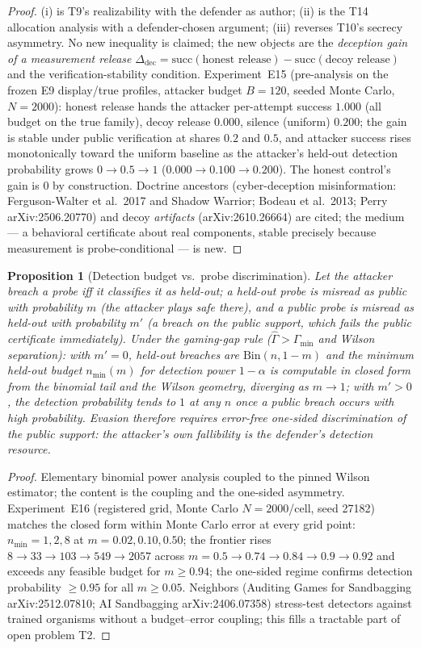 \documentclass[11pt]{article}
\newtheorem{proposition}{Proposition}
\begin{document}
\begin{proof}
(i) is T9's realizability with the defender as author; (ii) is the T14
allocation analysis with a defender-chosen argument; (iii) reverses T10's
secrecy asymmetry. No new inequality is claimed; the new objects are the
\emph{deception gain of a measurement release}
$\Delta_{\mathrm{dec}}=\mathrm{succ}(\text{honest release})-\mathrm{succ}(\text{decoy release})$
and the verification-stability condition. Experiment~E15 (pre-analysis on the
frozen E9 display/true profiles, attacker budget $B=120$, seeded Monte Carlo,
$N=2000$): honest release hands the attacker per-attempt success $1.000$ (all
budget on the true family), decoy release $0.000$, silence (uniform) $0.200$;
the gain is stable under public verification at shares $0.2$ and $0.5$, and
attacker success rises monotonically toward the uniform baseline as the
attacker's held-out detection probability grows $0\to0.5\to1$
($0.000\to0.100\to0.200$). The honest control's gain is $0$ by construction.
Doctrine ancestors (cyber-deception misinformation: Ferguson-Walter et
al.~2017 and Shadow Warrior; Bodeau et al.~2013; Perry arXiv:2506.20770) and
decoy \emph{artifacts} (arXiv:2610.26664) are cited; the medium --- a
behavioral certificate about real components, stable precisely because
measurement is probe-conditional --- is new.
\end{proof}
\begin{proposition}[Detection budget vs.\ probe discrimination]\label{prop:t16}
Let the attacker breach a probe iff it classifies it as held-out; a held-out
probe is misread as public with probability $m$ (the attacker plays safe
there), and a public probe is misread as held-out with probability $m'$ (a
breach on the public support, which fails the public certificate
immediately). Under the gaming-gap rule ($\hat\Gamma>\Gamma_{\min}$ and Wilson
separation): with $m'=0$, held-out breaches are $\mathrm{Bin}(n,1-m)$ and the
minimum held-out budget $n_{\min}(m)$ for detection power $1-\alpha$ is
computable in closed form from the binomial tail and the Wilson geometry,
diverging as $m\to1$; with $m'>0$, the detection probability tends to $1$ at
any $n$ once a public breach occurs with high probability. Evasion therefore
requires \emph{error-free one-sided discrimination} of the public support:
the attacker's own fallibility is the defender's detection resource.
\end{proposition}
\begin{proof}
Elementary binomial power analysis coupled to the pinned Wilson estimator; the
content is the coupling and the one-sided asymmetry. Experiment~E16
(registered grid, Monte Carlo $N=2000$/cell, seed 27182) matches the closed
form within Monte Carlo error at every grid point: $n_{\min}=1,2,8$ at
$m=0.02,0.10,0.50$; the frontier rises $8\to33\to103\to549\to2057$ across
$m=0.5\to0.74\to0.84\to0.9\to0.92$ and exceeds any feasible budget for
$m\ge0.94$; the one-sided regime confirms detection probability $\ge0.95$ for
all $m\ge0.05$. Neighbors (Auditing Games for Sandbagging arXiv:2512.07810;
AI Sandbagging arXiv:2406.07358) stress-test detectors against trained
organisms without a budget--error coupling; this fills a tractable part of
open problem T2.
\end{proof}
\end{document}
